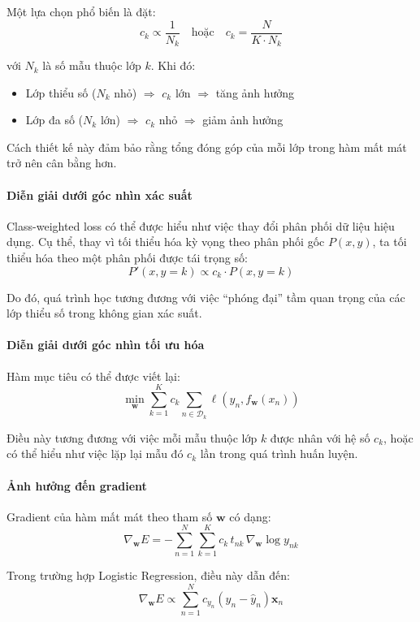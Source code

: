 Một lựa chọn phổ biến là đặt:
\[
c_k \propto \frac{1}{N_k}
\quad \text{hoặc} \quad
c_k = \frac{N}{K \cdot N_k}
\]

với $N_k$ là số mẫu thuộc lớp $k$. Khi đó:
\begin{itemize}
    \item Lớp thiểu số ($N_k$ nhỏ) $\Rightarrow$ $c_k$ lớn $\Rightarrow$ tăng ảnh hưởng
    \item Lớp đa số ($N_k$ lớn) $\Rightarrow$ $c_k$ nhỏ $\Rightarrow$ giảm ảnh hưởng
\end{itemize}

Cách thiết kế này đảm bảo rằng tổng đóng góp của mỗi lớp trong hàm mất mát trở nên cân bằng hơn.

\paragraph{Diễn giải dưới góc nhìn xác suất}

Class-weighted loss có thể được hiểu như việc thay đổi phân phối dữ liệu hiệu dụng. Cụ thể, thay vì tối thiểu hóa kỳ vọng theo phân phối gốc $P(x,y)$, ta tối thiểu hóa theo một phân phối được tái trọng số:
\[
P'(x,y=k) \propto c_k \cdot P(x,y=k)
\]

Do đó, quá trình học tương đương với việc “phóng đại” tầm quan trọng của các lớp thiểu số trong không gian xác suất.

\paragraph{Diễn giải dưới góc nhìn tối ưu hóa}

Hàm mục tiêu có thể được viết lại:
\[
\min_{\boldsymbol{w}} \sum_{k=1}^{K} c_k \sum_{n \in \mathcal{D}_k} \ell(y_n, f_{\boldsymbol{w}}(x_n))
\]

Điều này tương đương với việc mỗi mẫu thuộc lớp $k$ được nhân với hệ số $c_k$, hoặc có thể hiểu như việc lặp lại mẫu đó $c_k$ lần trong quá trình huấn luyện.

\paragraph{Ảnh hưởng đến gradient}

Gradient của hàm mất mát theo tham số $\boldsymbol{w}$ có dạng:
\[
\nabla_{\boldsymbol{w}} E = - \sum_{n=1}^{N} \sum_{k=1}^{K} c_k \, t_{nk} \, \nabla_{\boldsymbol{w}} \log y_{nk}
\]

Trong trường hợp Logistic Regression, điều này dẫn đến:
\[
\nabla_{\boldsymbol{w}} E \propto \sum_{n=1}^{N} c_{y_n} (y_n - \hat{y}_n)\boldsymbol{x}_n
\]

